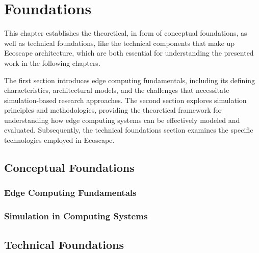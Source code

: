 \chapter{Foundations}
This chapter establishes the theoretical, in form of conceptual foundations, as well as technical foundations, like the technical components that make up Ecoscape architecture, 
which are both essential for understanding the presented work in the following chapters.

The first section introduces edge computing fundamentals, including its defining characteristics, architectural models, and the challenges that necessitate simulation-based research approaches.
The second section explores simulation principles and methodologies, providing the theoretical framework for understanding how edge computing systems can be effectively modeled and evaluated.
Subsequently, the technical foundations section examines the specific technologies employed in Ecoscape.
\section{Conceptual Foundations}
\subsection{Edge Computing Fundamentals}
\subsection{Simulation in Computing Systems}
\section{Technical Foundations}
